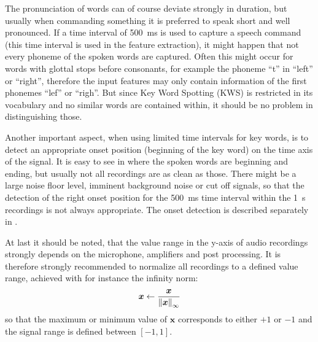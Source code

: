 The pronunciation of words can of course deviate strongly in duration, but usually when commanding something it is preferred to speak short and well pronounced.
If a time interval of \SI{500}{\milli\second} is used to capture a speech command (this time interval is used in the feature extraction), it might happen that not every phoneme of the spoken words are captured. 
Often this might occur for words with glottal stops before consonants, for example the phoneme \enquote{t} in \enquote{left} or \enquote{right}, therefore the input features may only contain information of the first phonemes \enquote{lef} or \enquote{righ}.
But since Key Word Spotting (KWS) is restricted in its vocabulary and no similar words are contained within, it should be no problem in distinguishing those.

Another important aspect, when using limited time intervals for key words, is to detect an appropriate onset position (beginning of the key word) on the time axis of the signal.
It is easy to see in  where the spoken words are beginning and ending, but usually not all recordings are as clean as those.
There might be a large noise floor level, imminent background noise or cut off signals, so that the detection of the right onset position for the \SI{500}{\milli\second} time interval within the \SI{1}{\second} recordings is not always appropriate.
The onset detection is described separately in .

At last it should be noted, that the value range in the y-axis of audio recordings strongly depends on the microphone, amplifiers and post processing.
It is therefore strongly recommended to normalize all recordings to a defined value range, achieved with for instance the infinity norm:
\begin{equation}
  \bm{x} \gets \frac{\bm{x}}{\norm{\bm{x}}_\infty}
\end{equation}
so that the maximum or minimum value of $\bm{x}$ corresponds to either $+1$ or $-1$ and the signal range is defined between $[-1, 1]$.